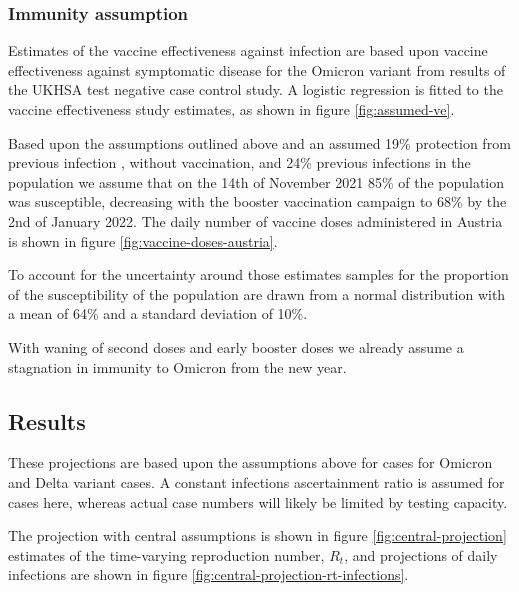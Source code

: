 \documentclass[
]{article}
\begin{document}
\hypertarget{immunity-assumption}{%
\subsubsection{Immunity assumption}\label{immunity-assumption}}

Estimates of the vaccine effectiveness against infection are based upon vaccine effectiveness against
symptomatic disease for the Omicron variant from results of the UKHSA test negative case control study. \autocite{ukhealthsecurityagencyOmicronVOC21NOV015292021}
A logistic regression is fitted to the vaccine effectiveness study estimates, as shown in figure \ref{fig:assumed-ve}.

Based upon the assumptions outlined above and an assumed 19\% protection from previous infection \autocite{fergusonReport49Growth2021}, without vaccination, and 24\% previous infections in the population we assume that on the 14th of November 2021 85\% of the
population was susceptible, decreasing with the booster vaccination campaign to 68\% by the 2nd of January 2022.
The daily number of vaccine doses administered in Austria \autocite{bmsgpkCOVID19ZeitreiheVerabreichten} is shown in figure \ref{fig:vaccine-doses-austria}.

To account for the uncertainty around those estimates samples for the proportion of the susceptibility
of the population are drawn from a normal distribution with a mean of 64\% and a standard
deviation of 10\%.

With waning of second doses and early booster doses we already assume a stagnation in immunity
to Omicron from the new year.

\hypertarget{results}{%
\subsection{Results}\label{results}}

These projections are based upon the assumptions above for cases for Omicron and Delta variant cases.
A constant infections ascertainment ratio is assumed for cases here, whereas actual case numbers
will likely be limited by testing capacity.

The projection with central assumptions is shown in figure \ref{fig:central-projection}
estimates of the time-varying reproduction number, \(R_t\), and projections of daily
infections are shown in figure \ref{fig:central-projection-rt-infections}.
\end{document}
